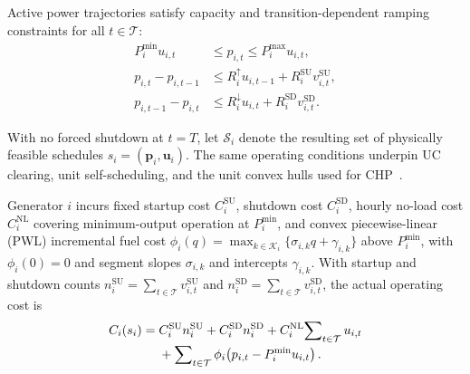 \documentclass[journal]{IEEEtran}
\newcommand{\bp}{\bm p}
\newcommand{\bu}{\bm u}
\newcommand{\Pmin}{P^{\min}}
\newcommand{\Pmax}{P^{\max}}
\newcommand{\Rup}{R^{\uparrow}}
\newcommand{\Rdn}{R^{\downarrow}}
\begin{document}
Active power trajectories satisfy capacity and transition-dependent ramping constraints for all $t\in\mathcal{T}$:
\begin{subequations}\label{eq:physical}
\begin{align}
 \Pmin_i u_{i,t} &\le p_{i,t}\le\Pmax_i u_{i,t},\\
 p_{i,t}-p_{i,t-1} &\le \Rup_i u_{i,t-1} + R_i^{\mathrm{SU}} v_{i,t}^{\mathrm{SU}},\\
 p_{i,t-1}-p_{i,t} &\le \Rdn_i u_{i,t} + R_i^{\mathrm{SD}} v_{i,t}^{\mathrm{SD}}.
\end{align}
\end{subequations}

With no forced shutdown at $t=T$, let $\mathcal{S}_i$ denote the resulting set of physically feasible schedules $s_i=(\bp_i,\bu_i)$. The same operating conditions underpin UC clearing, unit self-scheduling, and the unit convex hulls used for CHP~\cite{zhao2023dependence}.

Generator $i$ incurs fixed startup cost $C_i^{\mathrm{SU}}$, shutdown cost $C_i^{\mathrm{SD}}$, hourly no-load cost $C_i^{\mathrm{NL}}$ covering minimum-output operation at $\Pmin_i$, and convex piecewise-linear (PWL) incremental fuel cost $\phi_i(q)=\max\nolimits_{k\in\mathcal{K}_i}\{\sigma_{i,k}q+\gamma_{i,k}\}$ above $\Pmin_i$, with $\phi_i(0)=0$ and segment slopes $\sigma_{i,k}$ and intercepts $\gamma_{i,k}$. With startup and shutdown counts $n_i^{\mathrm{SU}}=\sum\nolimits_{t\in\mathcal{T}}v_{i,t}^{\mathrm{SU}}$ and $n_i^{\mathrm{SD}}=\sum\nolimits_{t\in\mathcal{T}}v_{i,t}^{\mathrm{SD}}$, the actual operating cost is
\begin{align}
C_i(s_i) ={}& C_i^{\mathrm{SU}}n_i^{\mathrm{SU}} + C_i^{\mathrm{SD}}n_i^{\mathrm{SD}}
+ C_i^{\mathrm{NL}}\!\sum\nolimits_{t\in\mathcal{T}}u_{i,t}\notag\\[-2pt]
&+ \sum\nolimits_{t\in\mathcal{T}}\phi_i\!\left(p_{i,t}-\Pmin_i u_{i,t}\right).\label{eq:cost}
\end{align}
\end{document}
